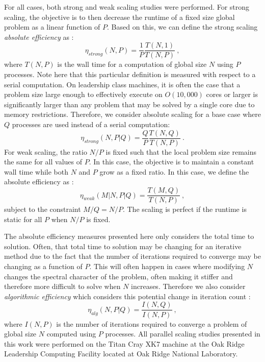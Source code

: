 \documentclass{snamc2013}
\begin{document}
For all cases, both strong and weak scaling studies were
performed. For strong scaling, the objective is to then decrease the
runtime of a fixed size global problem as a linear function of
$P$. Based on this, we can define the strong scaling \textit{absolute
  efficiency} as \cite{keyes_how_1999}:
\begin{equation}
  \eta_{strong}(N,P) = \frac{1}{P} \frac{T(N,1)}{T(N,P)}\:,
  \label{eq:strong_scaling_absolute}
\end{equation}
where $T(N,P)$ is the wall time for a computation of global size $N$
using $P$ processes. Note here that this particular definition is
measured with respect to a serial computation. On leadership class
machines, it is often the case that a problem size large enough to
effectively execute on $O(10,000)$ cores or larger is significantly
larger than any problem that may be solved by a single core due to
memory restrictions. Therefore, we consider absolute scaling for a
base case where $Q$ processes are used instead of a serial
computation:
\begin{equation}
  \eta_{strong}(N,P|Q) = \frac{Q}{P} \frac{T(N,Q)}{T(N,P)}\:.
  \label{eq:strong_scaling_absolute_ref}
\end{equation}
For weak scaling, the ratio $N/P$ is fixed such that the local problem
size remains the same for all values of $P$. In this case, the
objective is to maintain a constant wall time while both $N$ and $P$
grow as a fixed ratio. In this case, we define the absolute efficiency
as \cite{keyes_how_1999}:
\begin{equation}
  \eta_{weak}(M|N,P|Q) = \frac{T(M,Q)}{T(N,P)}\:,
  \label{eq:weak_scaling_absolute}
\end{equation}
subject to the constraint $M/Q = N/P$. The scaling is perfect if the
runtime is static for all $P$ when $N/P$ is fixed.  

The absolute efficiency measures presented here only considers the
total time to solution. Often, that total time to solution may be
changing for an iterative method due to the fact that the number of
iterations required to converge may be changing as a function of
$P$. This will often happen in cases where modifying $N$ changes the
spectral character of the problem, often making it stiffer and
therefore more difficult to solve when $N$ increases. Therefore we
also consider \textit{algorithmic efficiency} which considers this
potential change in iteration count \cite{keyes_how_1999}:
\begin{equation}
  \eta_{alg}(N,P|Q) = \frac{I(N,Q)}{I(N,P)}\:,
  \label{eq:algorithmic_efficiency}
\end{equation}
where $I(N,P)$ is the number of iterations required to converge a
problem of global size $N$ computed using $P$ processes.  All parallel
scaling studies presented in this work were performed on the Titan
Cray XK7 machine at the Oak Ridge Leadership Computing Facility
located at Oak Ridge National Laboratory.
\end{document}
